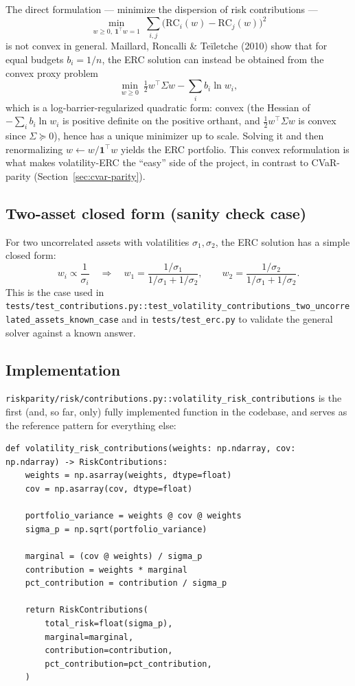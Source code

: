 \documentclass[11pt]{article}
\begin{document}
The direct formulation --- minimize the dispersion of risk contributions
---
\[
\min_{w \geq 0,\ \mathbf{1}^\top w = 1} \ \sum_{i,j} \big(\text{RC}_i(w) - \text{RC}_j(w)\big)^2
\]
is not convex in general. Maillard, Roncalli \& Teïletche (2010) show
that for equal budgets $b_i = 1/n$, the ERC solution can instead be
obtained from the convex proxy problem
\[
\min_{w \geq 0} \ \tfrac{1}{2} w^\top \Sigma w - \sum_i b_i \ln w_i,
\]
which is a log-barrier-regularized quadratic form: convex (the Hessian of
$-\sum_i b_i \ln w_i$ is positive definite on the positive orthant, and
$\tfrac12 w^\top \Sigma w$ is convex since $\Sigma \succeq 0$), hence has
a unique minimizer up to scale. Solving it and then renormalizing
$w \leftarrow w / \mathbf{1}^\top w$ yields the ERC portfolio. This convex
reformulation is what makes volatility-ERC the ``easy'' side of the
project, in contrast to CVaR-parity (Section~\ref{sec:cvar-parity}).

\subsection{Two-asset closed form (sanity check case)}
\label{sec:two-asset}

For two uncorrelated assets with volatilities $\sigma_1, \sigma_2$, the
ERC solution has a simple closed form:
\[
w_i \propto \frac{1}{\sigma_i} \quad\Longrightarrow\quad
w_1 = \frac{1/\sigma_1}{1/\sigma_1 + 1/\sigma_2}, \qquad
w_2 = \frac{1/\sigma_2}{1/\sigma_1 + 1/\sigma_2}.
\]
This is the case used in
\texttt{tests/test\_contributions.py::test\_volatility\_contributions\_two\_uncorrelated\_assets\_known\_case}
and in \texttt{tests/test\_erc.py} to validate the general solver against
a known answer.

\subsection{Implementation}
\label{sec:vol-erc-impl}

\texttt{riskparity/risk/contributions.py::volatility\_risk\_contributions}
is the first (and, so far, only) fully implemented function in the
codebase, and serves as the reference pattern for everything else:

\begin{lstlisting}
def volatility_risk_contributions(weights: np.ndarray, cov: np.ndarray) -> RiskContributions:
    weights = np.asarray(weights, dtype=float)
    cov = np.asarray(cov, dtype=float)

    portfolio_variance = weights @ cov @ weights
    sigma_p = np.sqrt(portfolio_variance)

    marginal = (cov @ weights) / sigma_p
    contribution = weights * marginal
    pct_contribution = contribution / sigma_p

    return RiskContributions(
        total_risk=float(sigma_p),
        marginal=marginal,
        contribution=contribution,
        pct_contribution=pct_contribution,
    )
\end{lstlisting}
\end{document}
